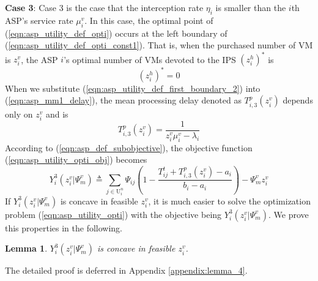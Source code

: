 \documentclass[10pt,journal, compsoc]{IEEEtran}
\newtheorem{lemma}{Lemma}
\begin{document}
\textbf{Case 3}: Case 3 is the case that the interception rate $\eta_i$ is smaller than the $i$th ASP's service rate $\mu_i^v$. In this case, the optimal point of (\ref{eqn:asp_utility_def_opti}) occurs at the left boundary of (\ref{eqn:asp_utility_def_opti_const1}). That is, when the purchased number of VM is $z_i^v$, the ASP $i$'s optimal number of VMs devoted to the IPS $(z_i^h)^*$ is
\begin{equation} \label{eqn:asp_utility_def_first_boundary_2}
(z_i^h)^* = 0
\end{equation}
When we substitute (\ref{eqn:asp_utility_def_first_boundary_2}) into (\ref{eqn:asp_mm1_delay}), the mean processing delay denoted as $T_{i,3}^p(z_i^v)$ depends only on $z_i^v$ and is
\begin{equation}\label{eqn:asp_case3_mm1_delay}
T_{i,3}^p(z_i^v) = \frac{1}{z_i^v \mu_i^v-\lambda_i}
\end{equation}
According to %
(\ref{eqn:asp_def_subobjective}), the objective function (\ref{eqn:asp_utility_opti_obj}) becomes
\begin{equation}\label{eqn:asp_case3_objective}
Y_i^3(z_i^v|\Psi_m^v) \triangleq \sum_{j \in \mathrm{U}_i^n}\Psi_{ij}(1-\frac{T_{ij}^t + T_{i,3}^p(z_i^v)-a_i}{b_i-a_i}) - \Psi_m^vz_i^v
\end{equation}
If $Y_i^3(z_i^v|\Psi_m^v)$ is concave in feasible $z_i^v$, it is much easier to solve the optimization problem (\ref{eqn:asp_utility_opti}) with the objective being $Y_i^3(z_i^v|\Psi_m^v)$. We prove this properties in the following.
\begin{lemma} \label{lemma:asp_case3_utility_concave}
$Y_i^3(z_i^v|\Psi_m^v)$ is concave in feasible $z_i^v$.
\end{lemma}
The detailed proof is deferred in Appendix \ref{appendix:lemma_4}.
\end{document}

